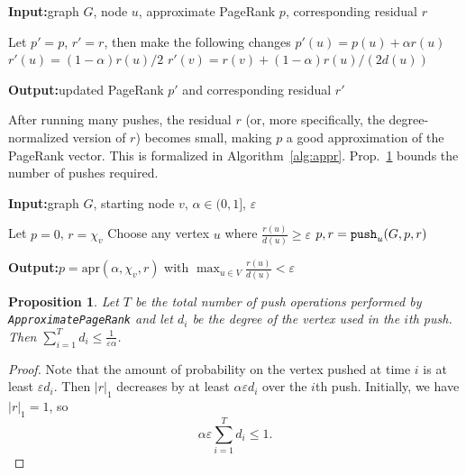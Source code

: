 \documentclass[11pt]{article}
\newtheorem{proposition}{Proposition}[section]
\renewcommand{\algorithmicrequire}{\textbf{Input:}}  %
\renewcommand{\algorithmicensure}{\textbf{Output:}} %
\begin{document}
\begin{algorithm}[H]
\algorithmicrequire graph $G$, node $u$, approximate PageRank $p$, corresponding residual $r$
\begin{algorithmic}
	\State Let $p'=p$, $r'=r$, then make the following changes
	\State $p'(u) = p(u) + \alpha r(u)$
	\State $r'(u) = (1-\alpha)r(u)/2$
		\State $r'(v) = r(v) + (1-\alpha)r(u)/(2d(u))$
	\EndFor
\end{algorithmic}
\algorithmicensure updated PageRank $p'$ and corresponding residual $r'$
\caption{${\tt push}_u(G,p,r)$} \label{alg:push}
\end{algorithm}

After running many pushes, the residual $r$ (or, more specifically, the degree-normalized version of $r$) becomes small, making $p$ a good approximation of the PageRank vector. This is formalized in Algorithm~\ref{alg:appr}. Prop.~\ref{prop:appr_iterations} bounds the number of pushes required.

\begin{algorithm}[H]
\algorithmicrequire graph $G$, starting node $v$, $\alpha \in (0,1]$, $\varepsilon$
\begin{algorithmic}
	\State Let $p = 0$, $r = \chi_v$
		\State Choose any vertex $u$ where $\frac{r(u)}{d(u)} \geq \varepsilon$
		\State $p,r = {\tt push}_u(G,p,r)$
	\EndWhile
\end{algorithmic}
\algorithmicensure $p = \text{apr}(\alpha,\chi_v,r)$ with $\max_{u\in V} \frac{r(u)}{d(u)} < \varepsilon$
\caption{${\tt ApproximatePageRank}(G,v,\alpha,\varepsilon)$} \label{alg:appr}
\end{algorithm}

\begin{proposition} \label{prop:appr_iterations}
Let $T$ be the total number of push operations performed by {\tt ApproximatePageRank} and let $d_i$ be the degree of the vertex used in the $i$th push. Then $\sum_{i=1}^T d_i \leq \frac{1}{\varepsilon \alpha}$.
\end{proposition}

\begin{proof}
Note that the amount of probability on the vertex pushed at time $i$ is at least $\varepsilon d_i$. Then $|r|_1$ decreases by at least $\alpha \varepsilon d_i$ over the $i$th push. Initially, we have $|r|_1 = 1$, so
$$\alpha \varepsilon \sum_{i=1}^T d_i \leq 1.$$
\end{proof}
\end{document}

